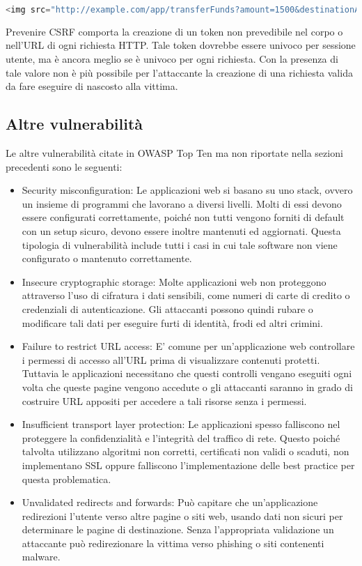 \begin{lstlisting}[language=PHP]
<img src="http://example.com/app/transferFunds?amount=1500&destinationAccount=attackersAcct#" width="0" height="0" />
\end{lstlisting}

Prevenire CSRF comporta la creazione di un token non prevedibile nel corpo o nell'URL di ogni richiesta HTTP. Tale token dovrebbe essere univoco per sessione utente, ma è ancora meglio se è univoco per ogni richiesta. Con la presenza di tale valore non è più possibile per l'attaccante la creazione di una richiesta valida da fare eseguire di nascosto alla vittima.

\subsection{Altre vulnerabilità}
Le altre vulnerabilità citate in OWASP Top Ten ma non riportate nella sezioni precedenti sono le seguenti:

\begin{itemize}
\item Security misconfiguration: Le applicazioni web si basano su uno stack, ovvero un insieme di programmi che lavorano a diversi livelli. Molti di essi devono essere configurati correttamente, poiché non tutti vengono forniti di default con un setup sicuro, devono essere inoltre mantenuti ed aggiornati. Questa tipologia di vulnerabilità include tutti i casi in cui tale software non viene configurato o mantenuto correttamente.
\item Insecure cryptographic storage: Molte applicazioni web non proteggono attraverso l'uso di cifratura i dati sensibili, come numeri di carte di credito o credenziali di autenticazione. Gli attaccanti possono quindi rubare o modificare tali dati per eseguire furti di identità, frodi ed altri crimini.
\item Failure to restrict URL access: E' comune per un'applicazione web controllare i permessi di accesso all'URL prima di visualizzare contenuti protetti. Tuttavia le applicazioni necessitano che questi controlli vengano eseguiti ogni volta che queste pagine vengono accedute o gli attaccanti saranno in grado di costruire URL appositi per accedere a tali risorse senza i permessi.
\item Insufficient transport layer protection: Le applicazioni spesso falliscono nel proteggere la confidenzialità e l'integrità del traffico di rete. Questo poiché talvolta utilizzano algoritmi non corretti, certificati non validi o scaduti, non implementano SSL oppure falliscono l'implementazione delle best practice per questa problematica.
\item Unvalidated redirects and forwards: Può capitare che un'applicazione redirezioni l'utente verso altre pagine o siti web, usando dati non sicuri per determinare le pagine di destinazione. Senza l'appropriata validazione un attaccante può redirezionare la vittima verso phishing o siti contenenti malware.
\end{itemize} 

